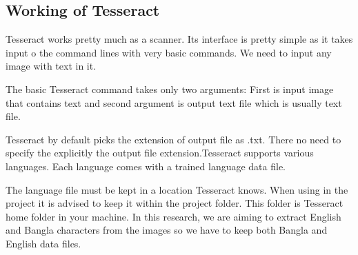 \subsection{Working of Tesseract}
Tesseract works pretty much as a scanner. Its interface is pretty simple as it takes input o the command lines with very basic commands. We need to input any image with text in it.

The basic Tesseract command takes only two arguments: First is input image that contains text and second argument is output text file which is usually text file.

Tesseract by default picks the extension of output file as .txt. There no need to specify the explicitly the output file extension.Tesseract supports various languages. Each language comes with a trained language data file.

The language file must be kept in a location Tesseract knows. When using in the project it is advised to keep it within the project folder. This folder is Tesseract home folder in your machine. In this research, we are aiming to extract English and Bangla characters from the images so we have to keep both Bangla and English data files. \cite{TesseractORCEngine}
 
